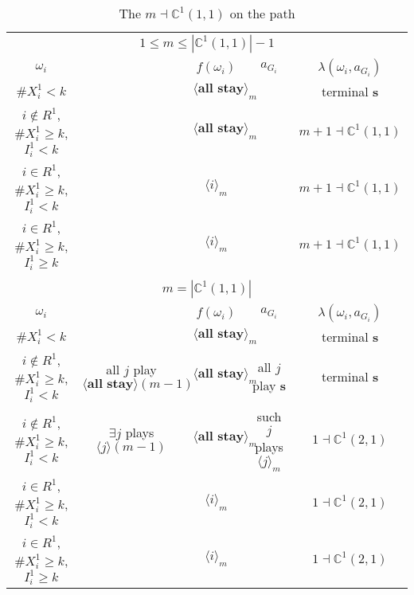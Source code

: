 \documentclass[12pt,letter]{article}
\newcommand{\Kappa}{\mathbb{C}}
\theoremstyle{definition}
\theoremstyle{definition}
\theoremstyle{remark}
\theoremstyle{claim}
\begin{document}
\begin{landscape}
\begin{table}[!htbp]
\caption{The $m\dashv\Kappa^1(1,1)$ on the path}
\label{table:eqm_path_k01}
\begin{center}
\begin{tabular}{c c | c | c | c }
\multicolumn{5}{c}{$1\leq m \leq |\Kappa^1(1,1)|-1$}\\
$\omega_i$ 	 & 	   &	$f(\omega_i)$  &	$a_{G_i}$ & $\lambda(\omega_i,a_{G_i})$ \\
\hline
\hline
$\# X^1_i<k$  	& 	 &$\langle \textbf{all stay} \rangle_m$ &	& terminal \textbf{s}\\
$i\notin R^1$, $\# X^1_i\geq k$, $I^1_i< k$  	&  &$\langle \textbf{all stay} \rangle_m$ & 	& $m+1\dashv\Kappa^1(1,1)$\\
$i\in R^1$, $\# X^1_i\geq k$, $I^1_i< k$  	& 	 &$\langle i \rangle_m$	&  & $m+1\dashv \Kappa^1(1,1)$\\
$i\in R^1$, $\# X^1_i\geq k$, $I^1_i\geq k$  	& 	 &$\langle i \rangle_m$	&  & $m+1\dashv \Kappa^1(1,1)$\\
\hline
\\
\multicolumn{5}{c}{$m=|\Kappa^1(1,1)|$}\\
$\omega_i$ 	 & 	   &	$f(\omega_i)$  &	$a_{G_i}$ & $\lambda(\omega_i,a_{G_i})$ \\
\hline
\hline
$\# X^1_i<k$  	& 	& $\langle \textbf{all stay} \rangle_m$	&     & terminal \textbf{s}\\
$i\notin R^1$, $\# X^1_i\geq k$, $I^1_i< k$   	& all $j$ play $\langle \textbf{all stay} \rangle(m-1)$ & $\langle \textbf{all stay} \rangle_m$	 & all $j$ play \textbf{s} & terminal \textbf{s}\\
$i\notin R^1$, $\# X^1_i\geq k$, $I^1_i< k$   	& $\exists j$ plays $\langle j \rangle(m-1)$ & $\langle \textbf{all stay} \rangle_m$	& such $j$ plays $\langle j \rangle_m$  & $1\dashv \Kappa^1(2,1)$\\
$i\in R^1$, $\# X^1_i\geq k$, $I^1_i< k$   	& 	& $\langle i \rangle_m$	&& $1\dashv \Kappa^1(2,1)$ \\
$i\in R^1$, $\# X^1_i\geq k$, $I^1_i\geq k$  	& 	& $\langle i \rangle_m$ &	& $1\dashv \Kappa^1(2,1)$ \\
\hline
\end{tabular}
\end{center}
\end{table}



\end{landscape}
\end{document}
